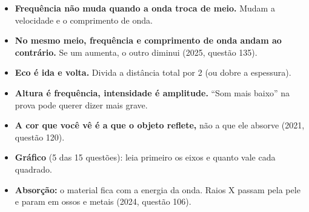 \begin{pegadinha}
\begin{itemize}
  \item \textbf{Frequência não muda quando a onda troca de meio.} Mudam a velocidade e o comprimento de onda.
  \item \textbf{No mesmo meio, frequência e comprimento de onda andam ao contrário.} Se um aumenta, o outro diminui (2025, questão 135).
  \item \textbf{Eco é ida e volta.} Divida a distância total por 2 (ou dobre a espessura).
  \item \textbf{Altura é frequência, intensidade é amplitude.} ``Som mais baixo'' na prova pode querer dizer mais grave.
  \item \textbf{A cor que você vê é a que o objeto reflete,} não a que ele absorve (2021, questão 120).
  \item \textbf{Gráfico} (5 das 15 questões): leia primeiro os eixos e quanto vale cada quadrado.
  \item \textbf{Absorção:} o material fica com a energia da onda. Raios X passam pela pele e param em ossos e metais (2024, questão 106).
\end{itemize}
\end{pegadinha}
